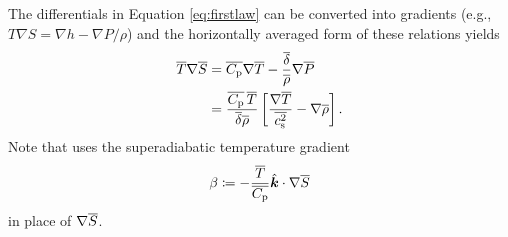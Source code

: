 \documentclass[12pt]{article}
\newcommand{\veck}{\hat{\bm{k}}}
\newcommand{\deltaref}{\overline{\delta}}
\newcommand{\cpref}{\overline{\cpcap}}
\newcommand{\cssqref}{\overline{\cs^2}}
\begin{document}
  The differentials in Equation \eqref{eq:firstlaw} can be converted into gradients (e.g., $T\nabla S= \nabla h - \nabla P/\rho$) and the horizontally averaged form of these relations yields 
  \begin{subequations}\label{eq:anfirstlaw}
  \begin{align}
  	\tmpref\nabla\sref &= \cpref\nabla\tmpref - \frac{\deltaref}{\rhoref}\nabla\prsref\\
  	 &= \frac{\cpref\,\tmpref}{\deltaref\rhoref}\left[\frac{\nabla\tmpref}{\cssqref}-\nabla\rhoref\right].
  \end{align}
  \end{subequations}
  Note that \citet{Gough1969} uses the superadiabatic temperature gradient
  \begin{align}
  	\beta\define -\frac{\tmpref}{\cpref}\veck\dotgrad\sref
  \end{align}
  in place of $\nabla \overline{S}$. 
  
\end{document}
